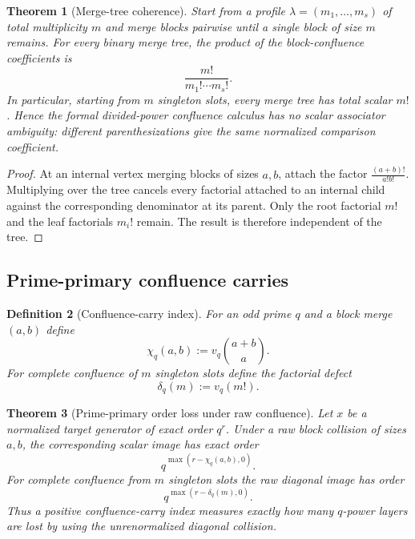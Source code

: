 \documentclass[11pt]{article}
\newtheorem{theorem}{Theorem}[section]
\newtheorem{definition}[theorem]{Definition}
\theoremstyle{remark}
\begin{document}
\begin{theorem}[Merge-tree coherence]\label{P1C-thm:merge-tree-coherence}
Start from a profile $\lambda=(m_1,\ldots,m_s)$ of total multiplicity $m$ and merge blocks pairwise until a single block of size $m$ remains.  For every binary merge tree, the product of the block-confluence coefficients is
\[
 \boxed{
 \frac{m!}{m_1!\cdots m_s!}.}
\]
In particular, starting from $m$ singleton slots, every merge tree has total scalar $m!$.  Hence the formal divided-power confluence calculus has no scalar associator ambiguity: different parenthesizations give the same normalized comparison coefficient.
\end{theorem}

\begin{proof}
At an internal vertex merging blocks of sizes $a,b$, attach the factor
$\frac{(a+b)!}{a!b!}$.  Multiplying over the tree cancels every factorial attached to an internal child against the corresponding denominator at its parent.  Only the root factorial $m!$ and the leaf factorials $m_i!$ remain.  The result is therefore independent of the tree.
\end{proof}

\subsection{Prime-primary confluence carries}

\begin{definition}[Confluence-carry index]\label{P1C-def:confluence-carry-index}
For an odd prime $q$ and a block merge $(a,b)$ define
\[
 \boxed{
 \chi_q(a,b):=v_q\binom{a+b}{a}.}
\]
For complete confluence of $m$ singleton slots define the factorial defect
\[
 \boxed{
 \delta_q(m):=v_q(m!).}
\]
\end{definition}

\begin{theorem}[Prime-primary order loss under raw confluence]\label{P1C-thm:confluence-order-loss}
Let $x$ be a normalized target generator of exact order $q^r$.  Under a raw block collision of sizes $a,b$, the corresponding scalar image has exact order
\[
 \boxed{
 q^{\max(r-\chi_q(a,b),0)}.}
\]
For complete confluence from $m$ singleton slots the raw diagonal image has order
\[
 \boxed{
 q^{\max(r-\delta_q(m),0)}.}
\]
Thus a positive confluence-carry index measures exactly how many $q$-power layers are lost by using the unrenormalized diagonal collision.
\end{theorem}
\end{document}
